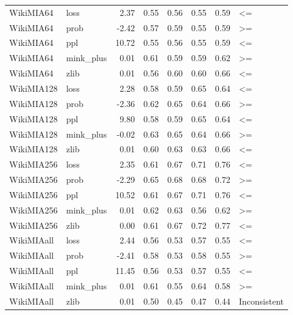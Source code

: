 \begin{tabular}{llrrrrrl}
 WikiMIA64 &      loss &           2.37 &           0.55 &     0.56 &          0.55 &    0.59 &                  <= \\
 WikiMIA64 &      prob &          -2.42 &           0.57 &     0.59 &          0.55 &    0.59 &                  >= \\
 WikiMIA64 &       ppl &          10.72 &           0.55 &     0.56 &          0.55 &    0.59 &                  <= \\
 WikiMIA64 & mink\_plus &           0.01 &           0.61 &     0.59 &          0.59 &    0.62 &                  >= \\
 WikiMIA64 &      zlib &           0.01 &           0.56 &     0.60 &          0.60 &    0.66 &                  <= \\
WikiMIA128 &      loss &           2.28 &           0.58 &     0.59 &          0.65 &    0.64 &                  <= \\
WikiMIA128 &      prob &          -2.36 &           0.62 &     0.65 &          0.64 &    0.66 &                  >= \\
WikiMIA128 &       ppl &           9.80 &           0.58 &     0.59 &          0.65 &    0.64 &                  <= \\
WikiMIA128 & mink\_plus &          -0.02 &           0.63 &     0.65 &          0.64 &    0.66 &                  >= \\
WikiMIA128 &      zlib &           0.01 &           0.60 &     0.63 &          0.63 &    0.66 &                  <= \\
WikiMIA256 &      loss &           2.35 &           0.61 &     0.67 &          0.71 &    0.76 &                  <= \\
WikiMIA256 &      prob &          -2.29 &           0.65 &     0.68 &          0.68 &    0.72 &                  >= \\
WikiMIA256 &       ppl &          10.52 &           0.61 &     0.67 &          0.71 &    0.76 &                  <= \\
WikiMIA256 & mink\_plus &           0.01 &           0.62 &     0.63 &          0.56 &    0.62 &                  >= \\
WikiMIA256 &      zlib &           0.00 &           0.61 &     0.67 &          0.72 &    0.77 &                  <= \\
WikiMIAall &      loss &           2.44 &           0.56 &     0.53 &          0.57 &    0.55 &                  <= \\
WikiMIAall &      prob &          -2.41 &           0.58 &     0.53 &          0.58 &    0.55 &                  >= \\
WikiMIAall &       ppl &          11.45 &           0.56 &     0.53 &          0.57 &    0.55 &                  <= \\
WikiMIAall & mink\_plus &           0.01 &           0.61 &     0.55 &          0.64 &    0.58 &                  >= \\
WikiMIAall &      zlib &           0.01 &           0.50 &     0.45 &          0.47 &    0.44 &        Inconsistent \\
\bottomrule
\end{tabular}
